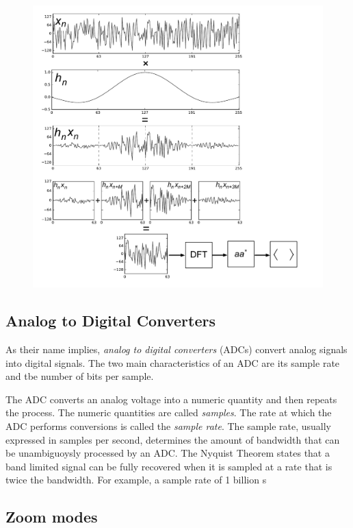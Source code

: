 \documentclass{ws-rv961x669}
\begin{document}
\begin{figure}
 \centering
 \includegraphics[width=\textwidth]{./figures/pfb_chart}
 \label{fig:pfb_chart}
 \caption{}
\end{figure}

\subsection{Analog to Digital Converters}\label{analog-to-digital-converters}

As their name implies, \emph{analog to digital converters} (ADCs)
convert analog signals into digital signals. The two main
characteristics of an ADC are its sample rate and tbe number of bits per
sample.

The ADC converts an analog voltage into a numeric quantity and then
repeats the process. The numeric quantities are called \emph{samples}.
The rate at which the ADC performs conversions is called the
\emph{sample rate}. The sample rate, usually expressed in samples per
second, determines the amount of bandwidth that can be unambiguoysly
processed by an ADC. The Nyquist Theorem states that a band limited
signal can be fully recovered when it is sampled at a rate that is twice
the bandwidth. For example, a sample rate of 1 billion s

\subsection{Zoom modes}
\end{document}
